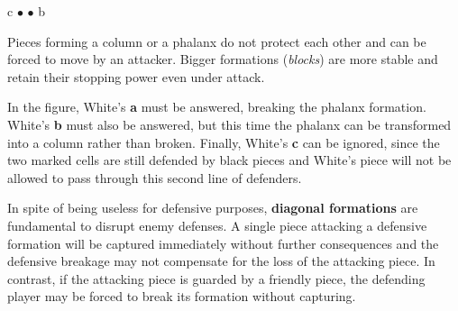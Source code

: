 \documentclass[a4paper,12pt]{article}
\begin{document}
    \begin{minipage}[c]{0.36\linewidth}
        \begin{center}
            \begin{othelloboardnorefs}{0.75}
                \annotationsfirstrow	{} {} {} {} {} {} {} {}
                \annotationssecondrow	{} {} {} {} {} {} {} {}
                 {} {} {} {} {} {{\sffamily c}}
                \annotationsfourthrow	{} {} {} {} {} {} {$\bullet$} {$\bullet$}
                \annotationsfifthrow	{} {} {} {} {} {} {} {}
                \annotationssixthrow	{} {} {} {} {} {} {} {}
                \annotationsseventhrow	{} {{\sffamily b}}{} {} {} {} {} {}
                \annotationseighthrow	{} {} {} {} {} {} {} {}
            \end{othelloboardnorefs}
        \end{center}
    \end{minipage}
    \hfill
    \begin{minipage}[c]{0.62\linewidth}
        Pieces forming a column or a phalanx do not protect each other and can be forced to move by an attacker.  Bigger formations (\emph{blocks}) are more stable and retain their stopping power even under attack.

        In the figure, White's \textbf{a} must be answered, breaking the phalanx formation.  White's \textbf{b} must also be answered, but this time the phalanx can be transformed into a column rather than broken.  Finally, White's \textbf{c} can be ignored, since the two marked cells are still defended by black pieces and White's piece will not be allowed to pass through this second line of defenders.
    \end{minipage}

    In spite of being useless for defensive purposes, \textbf{diagonal formations} are fundamental to disrupt enemy defenses.  A single piece attacking a defensive formation will be captured immediately without further consequences and the defensive breakage may not compensate for the loss of the attacking piece.  In contrast, if the attacking piece is guarded by a friendly piece, the defending player may be forced to break its formation without capturing.
\end{document}
